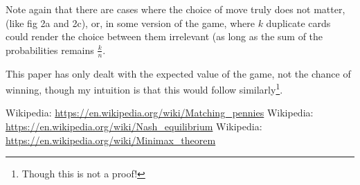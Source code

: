 \documentclass[11pt, oneside]{article} 	%
\begin{document}
Note again that there are cases where the choice of move truly does not matter, (like fig 2a and 2c), or, in some version of the game, where $k$ duplicate cards could render the choice between them irrelevant (as long as the sum of the probabilities remains $\frac{k}{n}$.

This paper has only dealt with the expected value of the game, not the chance of winning, though my intuition is that this would follow similarly\footnote{Though this is not a proof!}.



\begin{thebibliography}{9}
 Wikipedia: \url{https://en.wikipedia.org/wiki/Matching_pennies}
 Wikipedia: \url{https://en.wikipedia.org/wiki/Nash_equilibrium}
 Wikipedia: \url{https://en.wikipedia.org/wiki/Minimax_theorem}
\end{thebibliography}
\end{document}
